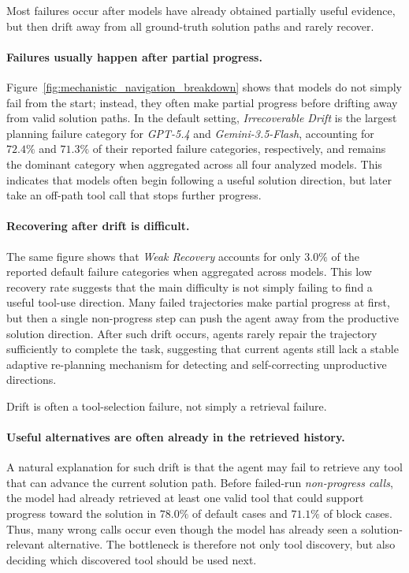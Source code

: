 \begin{takeaway}
Most failures occur after models have already obtained partially useful evidence, but then drift away from all ground-truth solution paths and rarely recover.
\end{takeaway}

\paragraph{Failures usually happen after partial progress.}
Figure~\ref{fig:mechanistic_navigation_breakdown} shows that models do not simply fail from the start; instead, they often make partial progress before drifting away from valid solution paths.
In the default setting, \textit{Irrecoverable Drift} is the largest planning failure category for \textit{GPT-5.4} and \textit{Gemini-3.5-Flash}, accounting for $72.4\%$ and $71.3\%$ of their reported failure categories, respectively, and remains the dominant category when aggregated across all four analyzed models.
This indicates that models often begin following a useful solution direction, but later take an off-path tool call that stops further progress.

\paragraph{Recovering after drift is difficult.}
The same figure shows that \textit{Weak Recovery} accounts for only $3.0\%$ of the reported default failure categories when aggregated across models.
This low recovery rate suggests that the main difficulty is not simply failing to find a useful tool-use direction.
Many failed trajectories make partial progress at first, but then a single non-progress step can push the agent away from the productive solution direction.
After such drift occurs, agents rarely repair the trajectory sufficiently to complete the task, suggesting that current agents still lack a stable adaptive re-planning mechanism for detecting and self-correcting unproductive directions.

\begin{takeaway}
Drift is often a tool-selection failure, not simply a retrieval failure.
\end{takeaway}

\paragraph{Useful alternatives are often already in the retrieved history.}
A natural explanation for such drift is that the agent may fail to retrieve any tool that can advance the current solution path.
Before failed-run \textit{non-progress calls}, the model had already retrieved at least one valid tool that could support progress toward the solution in $78.0\%$ of default cases and $71.1\%$ of block cases.
Thus, many wrong calls occur even though the model has already seen a solution-relevant alternative.
The bottleneck is therefore not only tool discovery, but also deciding which discovered tool should be used next.

